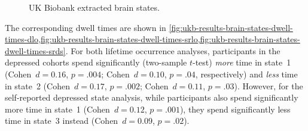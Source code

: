 \begin{figure}[ht]
  \centering
  \caption{
    UK Biobank extracted brain states.
  }
  \label{fig:ukb-results-brain-states}
\end{figure}


The corresponding dwell times are shown in \cref{fig:ukb-results-brain-states-dwell-times-dlo,fig:ukb-results-brain-states-dwell-times-srlo,fig:ukb-results-brain-states-dwell-times-srds}.
For both lifetime occurrence analyses, participants in the depressed cohorts spend significantly (two-sample $t$-test) \emph{more} time in state~1 (Cohen~$d = 0.16$, $p = .004$; Cohen~$d = 0.10$, $p = .04$, respectively) and \emph{less} time in state~2 (Cohen~$d = 0.17$, $p = .002$; Cohen~$d = 0.11$, $p = .03$).
However, for the self-reported depressed state analysis, while participants also spend significantly more time in state~1 (Cohen~$d = 0.12$, $p = .001$), they spend significantly less time in state~3 instead (Cohen~$d = 0.09$, $p = .02$).

